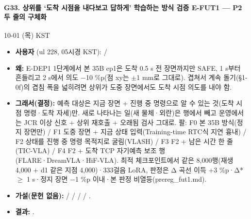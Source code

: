 \paragraph{G33. 상위를 `도착 시점을 내다보고 답하게' 학습하는 방식 검증 E-FUT1 --- P2 두 줄의 구체화}
{\small 10-01 (목) KST}
\begin{itemize}
  \item \textbf{사용자} (ul 228, 05시경 KST):  / 
  \item \textbf{왜:} E-DEP1 1단계에서 본 35B ep1은 도착 0.5 s 전 장면까지만 SAFE, 1 s부터 흔들리고 2 s에서 의도 $-$10 \%p(점 xy는 $\pm$1 mm로 그대로). 겹쳐서 계속 돌기(§1-0f)의 겹침 폭을 넓히려면 상위가 도중 장면에서도 도착 시점 의도를 내야 함.
  \item \textbf{그래서(결정):} 예측 대상은 지금 장면 + 진행 중 명령으로 알 수 있는 것(도착 시점 명령·도착 자세)만. 새로 나타나는 일(새 물체·외란)은 행에서 빼고 운영에서는 JCR 이상 신호 + 상위 재호출 + 오래됨 검사 그대로. 팔: F0 본 35B 방식(정지 장면만) / F1 도중 장면 + 지금 상태 입력(Training-time RTC식 지연 흉내) / F2 상태를 진행 중 명령 목적지로 굴림(VLASH) / F3 F2 + 남은 시간 한 줄(TIC-VLA) / F4 F2 + 도착 TCP 자기예측 보조 행(FLARE·DreamVLA·HiF-VLA). 최적 체크포인트에서 같은 8,000행(재생 4,000 + d1 같은 지점 4,000)·333걸음 LoRA, 판정은 Δ 곡선 이득 +3 \%p·Δ* $\ge$ 1 s·정지 장면 $-$1 \%p 이내·본 판정 비열등(prereg\_fut1.md).
  \item \textbf{가설(문헌 없음):}  /  /  /  / .
  \item \textbf{결과:} .
\end{itemize}

